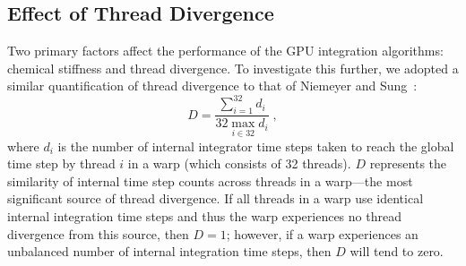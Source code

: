 \documentclass[final,twocolumn]{elsarticle}
\begin{document}
\subsection{Effect of Thread Divergence}
\label{S:divergence}
Two primary factors affect the performance of the GPU integration algorithms: chemical stiffness and thread divergence.
To investigate this further, we adopted a similar quantification of thread divergence to that of Niemeyer and Sung~\cite{Niemeyer:2014aa}:
\begin{equation}
	D = \frac{\sum_{i=1}^{32}{d_i}}{32 \max_{i \in 32} d_i} \;,
	\label{eqn:divergence}
\end{equation}
where $d_i$ is the number of internal integrator time steps taken to reach the global time step by thread $i$ in a warp (which consists of 32 threads).
$D$ represents the similarity of internal time step counts across threads in a warp---the most significant source of thread divergence.
If all threads in a warp use identical internal integration time steps and thus the warp experiences no thread divergence from this source, then $D = 1$; however, if a warp experiences an unbalanced number of internal integration time steps, then $D$ will tend to zero.
\end{document}
